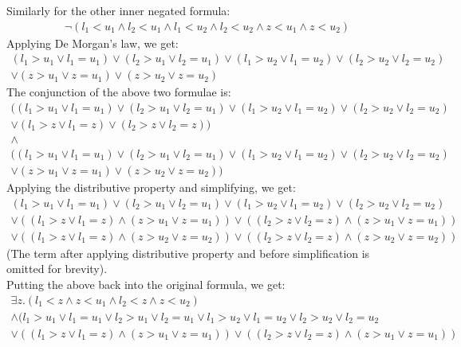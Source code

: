 \documentclass[12pt,letterpaper, onecolumn]{exam}
\begin{document}
\begin{questions}
	Similarly for the other inner negated formula:
	\begin{align*}
		\neg (l_1 < u_1 \land l_2 < u_1 \land l_1 < u_2 \land l_2 < u_2 \land z < u_1 \land z < u_2)
	\end{align*}
	Applying De Morgan's law, we get:
	\begin{align*}
		(l_1 > u_1 \lor l_1 = u_1) \lor (l_2 > u_1 \lor l_2 = u_1) \lor (l_1 > u_2 \lor l_1 = u_2) \lor (l_2 > u_2 \lor l_2 = u_2) \\
		\lor (z > u_1 \lor z = u_1) \lor (z > u_2 \lor z = u_2)
	\end{align*}
	The conjunction of the above two formulae is:
	\begin{align*}
		((l_1 > u_1 \lor l_1 = u_1) \lor (l_2 > u_1 \lor l_2 = u_1) \lor (l_1 > u_2 \lor l_1 = u_2) \lor (l_2 > u_2 \lor l_2 = u_2) \\
		\lor (l_1 > z \lor l_1 = z) \lor (l_2 > z \lor l_2 = z)) \\
		\land \\
		((l_1 > u_1 \lor l_1 = u_1) \lor (l_2 > u_1 \lor l_2 = u_1) \lor (l_1 > u_2 \lor l_1 = u_2) \lor (l_2 > u_2 \lor l_2 = u_2) \\
		\lor (z > u_1 \lor z = u_1) \lor (z > u_2 \lor z = u_2))
	\end{align*}
	Applying the distributive property and simplifying, we get:
	\begin{align*}
		(l_1 > u_1 \lor l_1 = u_1) \lor (l_2 > u_1 \lor l_2 = u_1) \lor (l_1 > u_2 \lor l_1 = u_2) \lor (l_2 > u_2 \lor l_2 = u_2) \\
		\lor (( l_1 > z \lor l_1 = z) \land (z > u_1 \lor z = u_1)) \lor (( l_2 > z \lor l_2 = z) \land (z > u_1 \lor z = u_1)) \\
		\lor (( l_1 > z \lor l_1 = z) \land (z > u_2 \lor z = u_2)) \lor (( l_2 > z \lor l_2 = z) \land (z > u_2 \lor z = u_2))
	\end{align*}
	(The term after applying distributive property and before simplification is omitted for brevity). \\
	Putting the above back into the original formula, we get:
	\begin{align*}
		\exists z. ( l_1 < z \land z < u_1 \land l_2 < z \land z < u_2 ) \\
		\land (l_1 > u_1 \lor l_1 = u_1 \lor l_2 > u_1 \lor l_2 = u_1 \lor l_1 > u_2 \lor l_1 = u_2 \lor l_2 > u_2 \lor l_2 = u_2 \\
		\lor (( l_1 > z \lor l_1 = z) \land (z > u_1 \lor z = u_1)) \lor (( l_2 > z \lor l_2 = z) \land (z > u_1 \lor z = u_1)) \\

\end{align*}
\end{questions}
\end{document}
